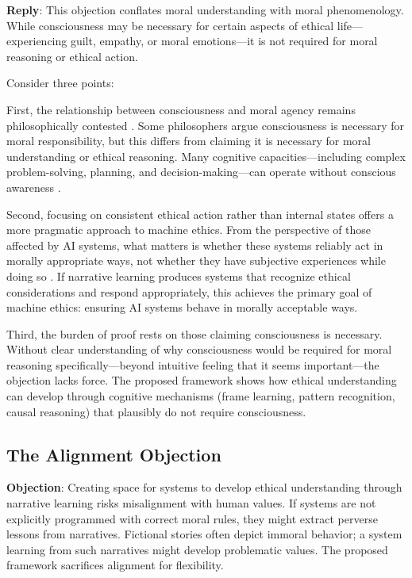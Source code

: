 \documentclass[12pt]{article}
\begin{document}
\textbf{Reply}: This objection conflates moral understanding with moral phenomenology. While consciousness may be necessary for certain aspects of ethical life—experiencing guilt, empathy, or moral emotions—it is not required for moral reasoning or ethical action.

Consider three points:

First, the relationship between consciousness and moral agency remains philosophically contested \citep{levy2014consciousness, shepherd2018consciousness}. Some philosophers argue consciousness is necessary for moral responsibility, but this differs from claiming it is necessary for moral understanding or ethical reasoning. Many cognitive capacities—including complex problem-solving, planning, and decision-making—can operate without conscious awareness \citep{carruthers2015conscious}.

Second, focusing on consistent ethical action rather than internal states offers a more pragmatic approach to machine ethics. From the perspective of those affected by AI systems, what matters is whether these systems reliably act in morally appropriate ways, not whether they have subjective experiences while doing so \citep{bryson2018patiency}. If narrative learning produces systems that recognize ethical considerations and respond appropriately, this achieves the primary goal of machine ethics: ensuring AI systems behave in morally acceptable ways.

Third, the burden of proof rests on those claiming consciousness is necessary. Without clear understanding of why consciousness would be required for moral reasoning specifically—beyond intuitive feeling that it seems important—the objection lacks force. The proposed framework shows how ethical understanding can develop through cognitive mechanisms (frame learning, pattern recognition, causal reasoning) that plausibly do not require consciousness.

\subsection{The Alignment Objection}

\textbf{Objection}: Creating space for systems to develop ethical understanding through narrative learning risks misalignment with human values. If systems are not explicitly programmed with correct moral rules, they might extract perverse lessons from narratives. Fictional stories often depict immoral behavior; a system learning from such narratives might develop problematic values. The proposed framework sacrifices alignment for flexibility.
\end{document}
